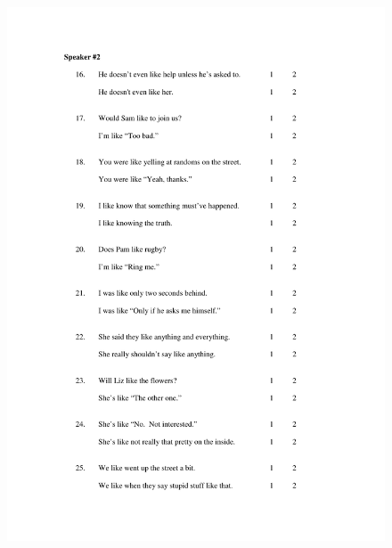 \begin{figure}
	\centering
		\includegraphics[width=5in]{images/Exp2page3.pdf}
			\label{x2p3}
\end{figure}

